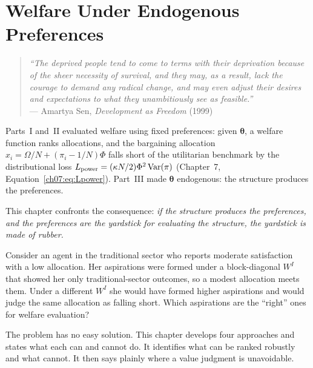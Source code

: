\documentclass[../structural_economics_book.tex]{subfiles}
\begin{document}
\ifSubfilesClassLoaded{\setcounter{chapter}{11}}{}
\chapter{Welfare Under Endogenous Preferences}\label{ch:12}
\begin{quote}
\textit{``The deprived people tend to come to terms with their deprivation because of the sheer necessity of survival, and they may, as a result, lack the courage to demand any radical change, and may even adjust their desires and expectations to what they unambitiously see as feasible.''}\\
\hfill --- Amartya Sen, \textit{Development as Freedom} (1999)
\end{quote}
\nocite{sen1999development}

\vspace{1em}

Parts~I and~II evaluated welfare using fixed preferences: given $\boldsymbol{\theta}$, a welfare function ranks allocations, and the bargaining allocation $x_i = \Omega/N + (\pi_i - 1/N)\Phi$ falls short of the utilitarian benchmark by the distributional loss $L_{\text{power}} = (\kappa N/2)\Phi^2\operatorname{Var}(\pi)$ (Chapter~7, Equation~\eqref{ch07:eq:Lpower}). Part~III made $\boldsymbol{\theta}$ endogenous: the structure produces the preferences.

This chapter confronts the consequence: \textit{if the structure produces the preferences, and the preferences are the yardstick for evaluating the structure, the yardstick is made of rubber.}

Consider an agent in the traditional sector who reports moderate satisfaction with a low allocation. Her aspirations were formed under a block-diagonal $W^I$ that showed her only traditional-sector outcomes, so a modest allocation meets them. Under a different $W^I$ she would have formed higher aspirations and would judge the same allocation as falling short. Which aspirations are the ``right'' ones for welfare evaluation?

The problem has no easy solution. This chapter develops four approaches and states what each can and cannot do. It identifies what can be ranked robustly and what cannot. It then says plainly where a value judgment is unavoidable.
\end{document}
